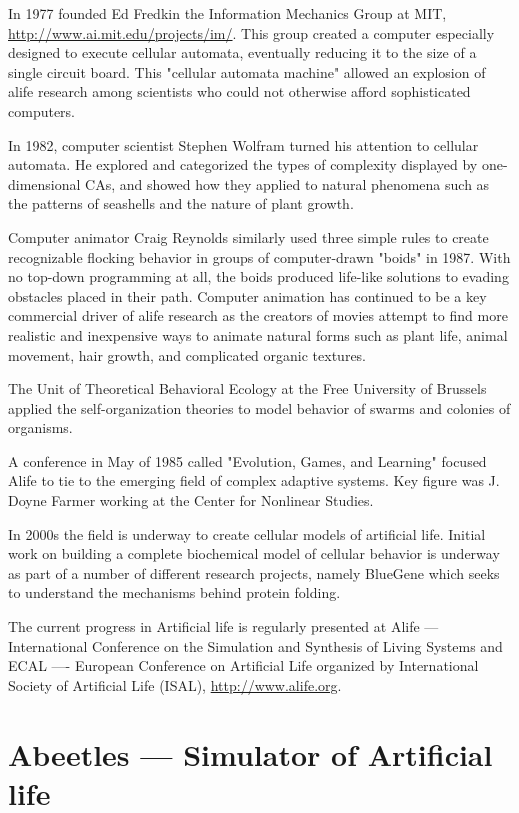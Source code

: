 \documentclass[a4paper,12pt]{report}
\begin{document}
In 1977 founded Ed Fredkin the Information Mechanics Group at MIT, \url{http://www.ai.mit.edu/projects/im/}. This group created a computer especially designed to execute cellular automata, eventually reducing it to the size of a single circuit board. This "cellular automata machine" allowed an explosion of alife research among scientists who could not otherwise afford sophisticated computers.

In 1982, computer scientist Stephen Wolfram turned his attention to cellular automata. He explored and categorized the types of complexity displayed by one-dimensional CAs, and showed how they applied to natural phenomena such as the patterns of seashells and the nature of plant growth. 

Computer animator Craig Reynolds similarly used three simple rules to create recognizable flocking behavior in groups of computer-drawn "boids" in 1987. With no top-down programming at all, the boids produced life-like solutions to evading obstacles placed in their path. Computer animation has continued to be a key commercial driver of alife research as the creators of movies attempt to find more realistic and inexpensive ways to animate natural forms such as plant life, animal movement, hair growth, and complicated organic textures.

The Unit of Theoretical Behavioral Ecology at the Free University of Brussels applied the self-organization theories to model behavior of swarms and colonies of organisms.

A conference in May of 1985 called "Evolution, Games, and Learning" focused Alife to tie to the emerging field of complex adaptive systems. Key figure was J. Doyne Farmer working at the Center for Nonlinear Studies.

In 2000s the field is underway to create cellular models of artificial life. Initial work on building a complete biochemical model of cellular behavior is underway as part of a number of different research projects, namely BlueGene which seeks to understand the mechanisms behind protein folding.

The current progress in Artificial life is regularly presented at Alife ---International Conference on the Simulation and Synthesis of Living Systems and ECAL ---- European Conference on Artificial Life organized by International Society of Artificial Life (ISAL), \url{http://www.alife.org}. 

\section{Abeetles --- Simulator of Artificial life}
\end{document}
